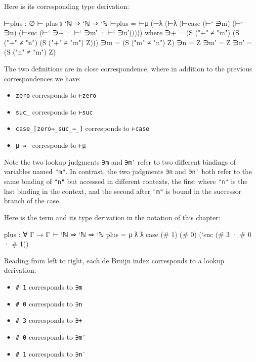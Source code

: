 Here is its corresponding type derivation:

\begin{myDisplay}
⊢plus : ∅ ⊢ plus ⦂ `ℕ ⇒ `ℕ ⇒ `ℕ
⊢plus = ⊢μ (⊢ƛ (⊢ƛ (⊢case (⊢` ∋m) (⊢` ∋n)
         (⊢suc (⊢` ∋+ · ⊢` ∋m′ · ⊢` ∋n′)))))
  where
  ∋+  = (S ("+" ≠ "m") (S ("+" ≠ "n") (S ("+" ≠ "m") Z)))
  ∋m  = (S ("m" ≠ "n") Z)
  ∋n  = Z
  ∋m′ = Z
  ∋n′ = (S ("n" ≠ "m") Z)
\end{myDisplay}

The two definitions are in close correspondence, where in addition to
the previous correspondences we have:

\begin{itemize}
\tightlist
\item
  \texttt{\textasciigrave{}zero} corresponds to \texttt{⊢zero}
\item
  \texttt{\textasciigrave{}suc\_} corresponds to \texttt{⊢suc}
\item
  \texttt{case\_{[}zero⇒\_\textbar{}suc\_⇒\_{]}} corresponds to
  \texttt{⊢case}
\item
  \texttt{μ\_⇒\_} corresponds to \texttt{⊢μ}
\end{itemize}

Note the two lookup judgments \texttt{∋m} and \texttt{∋m′} refer to two
different bindings of variables named \texttt{"m"}. In contrast, the two
judgments \texttt{∋n} and \texttt{∋n′} both refer to the same binding of
\texttt{"n"} but accessed in different contexts, the first where
\texttt{"n"} is the last binding in the context, and the second after
\texttt{"m"} is bound in the successor branch of the case.

Here is the term and its type derivation in the notation of this
chapter:

\begin{myDisplay}
plus : ∀ {Γ} → Γ ⊢ `ℕ ⇒ `ℕ ⇒ `ℕ
plus = μ ƛ ƛ case (# 1) (# 0) (`suc (# 3 · # 0 · # 1))
\end{myDisplay}

Reading from left to right, each de Bruijn index corresponds to a lookup
derivation:

\begin{itemize}
\tightlist
\item
  \texttt{\#\ 1} corresponds to \texttt{∋m}
\item
  \texttt{\#\ 0} corresponds to \texttt{∋n}
\item
  \texttt{\#\ 3} corresponds to \texttt{∋+}
\item
  \texttt{\#\ 0} corresponds to \texttt{∋m′}
\item
  \texttt{\#\ 1} corresponds to \texttt{∋n′}
\end{itemize}

